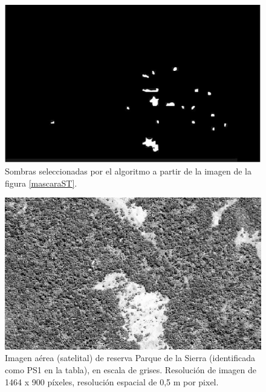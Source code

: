 \begin{figure}[h!]
    \includegraphics[width=\textwidth]{Imagenes/Homomorfico/ST2_masked.png}
     \hfill
     \caption{Sombras seleccionadas por el algoritmo a partir de la imagen de la figura \ref{mascaraST}.}
    \label{seleccionadaST}
\end{figure}
\begin{figure}[h!]
    \includegraphics[width=\textwidth]{Imagenes/Homomorfico/PS1_original.jpg}
     \hfill
     \caption{Imagen aérea (satelital) de reserva Parque de la Sierra (identificada como PS1 en la tabla), en escala de grises. Resolución de imagen de 1464 x 900 píxeles, resolución espacial de 0,5 m por pixel.}
    \label{PS1}
\end{figure}

